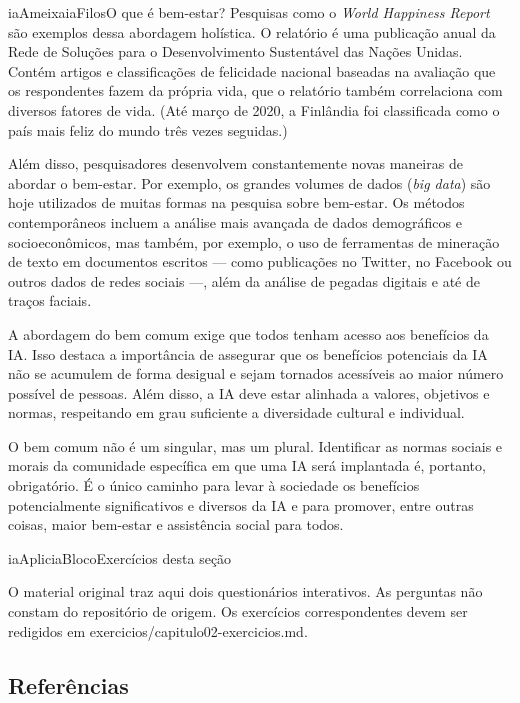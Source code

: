 \documentclass[
  11pt,
]{article}
\renewcommand{\texttt}[1]{{\color{iaAmeixa}\small\ttfamily #1}}
\newenvironment{filosofia}[1][Conceito filosofico]{\begin{iabox}{iaAmeixa}{iaFilos}{#1}}{\end{iabox}}
\newenvironment{reflexao}[1][Para pensar]{\begin{iabox}{iaAplic}{iaBloco}{#1}}{\end{iabox}}
\begin{document}
\begin{filosofia}[O que é bem-estar?]
Pesquisas como o \emph{World Happiness Report} são exemplos dessa
abordagem holística. O relatório é uma publicação anual da Rede de
Soluções para o Desenvolvimento Sustentável das Nações Unidas. Contém
artigos e classificações de felicidade nacional baseadas na avaliação
que os respondentes fazem da própria vida, que o relatório também
correlaciona com diversos fatores de vida. (Até março de 2020, a
Finlândia foi classificada como o país mais feliz do mundo três vezes
seguidas.)

Além disso, pesquisadores desenvolvem constantemente novas maneiras de
abordar o bem-estar. Por exemplo, os grandes volumes de dados (\emph{big
data}) são hoje utilizados de muitas formas na pesquisa sobre bem-estar.
Os métodos contemporâneos incluem a análise mais avançada de dados
demográficos e socioeconômicos, mas também, por exemplo, o uso de
ferramentas de mineração de texto em documentos escritos --- como
publicações no Twitter, no Facebook ou outros dados de redes sociais
---, além da análise de pegadas digitais e até de traços faciais.

\end{filosofia}

A abordagem do bem comum exige que todos tenham acesso aos benefícios da
IA. Isso destaca a importância de assegurar que os benefícios potenciais
da IA não se acumulem de forma desigual e sejam tornados acessíveis ao
maior número possível de pessoas. Além disso, a IA deve estar alinhada a
valores, objetivos e normas, respeitando em grau suficiente a
diversidade cultural e individual.

O bem comum não é um singular, mas um plural. Identificar as normas
sociais e morais da comunidade específica em que uma IA será implantada
é, portanto, obrigatório. É o único caminho para levar à sociedade os
benefícios potencialmente significativos e diversos da IA e para
promover, entre outras coisas, maior bem-estar e assistência social para
todos.

\begin{reflexao}[Exercícios desta seção]

O material original traz aqui dois questionários interativos. As
perguntas não constam do repositório de origem. Os exercícios
correspondentes devem ser redigidos em
\texttt{exercicios/capitulo02-exercicios.md}.

\end{reflexao}

\subsection{Referências}\label{referuxeancias}
\end{document}
